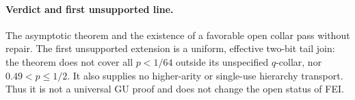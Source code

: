 \documentclass{article}
\begin{document}
\paragraph{Verdict and first unsupported line.}
The asymptotic theorem and the existence of a favorable open collar pass
without repair.  The first unsupported extension is a uniform, effective
two-bit tail join: the theorem does not cover all $p<1/64$ outside its
unspecified $q$-collar, nor $0.49<p\le1/2$.  It also supplies no higher-arity
or single-use hierarchy transport.  Thus it is not a universal GU proof and
does not change the open status of FEI.
\end{document}
